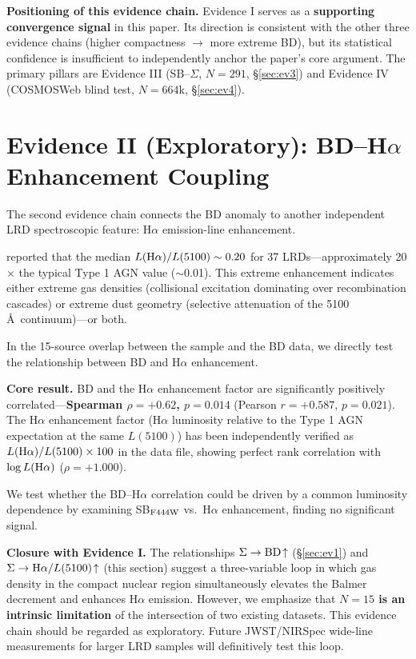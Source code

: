 \documentclass[twocolumn,linenumbers]{aastex631}
\begin{document}
\textbf{Positioning of this evidence chain.} Evidence I serves as a \textbf{supporting convergence signal} in this paper. Its direction is consistent with the other three evidence chains (higher compactness $\rightarrow$ more extreme BD), but its statistical confidence is insufficient to independently anchor the paper's core argument. The primary pillars are Evidence III (SB--$\Sigma$, $N=291$, \S\ref{sec:ev3}) and Evidence IV (COSMOSWeb blind test, $N=664$k, \S\ref{sec:ev4}).

\section{Evidence II (Exploratory): BD--H$\alpha$ Enhancement Coupling} \label{sec:ev2}

The second evidence chain connects the BD anomaly to another independent LRD spectroscopic feature: H$\alpha$ emission-line enhancement.

\citet{Yanagisawa2026} reported that the median $L({\rm H}\alpha)/L(5100) \sim 0.20$ for 37 LRDs---approximately 20$\times$ the typical Type 1 AGN value ($\sim$0.01). This extreme enhancement indicates either extreme gas densities (collisional excitation dominating over recombination cascades) or extreme dust geometry (selective attenuation of the 5100\,\AA\ continuum)---or both.

In the 15-source overlap between the \citet{Yanagisawa2026} sample and the \citet{deGraaff2025} BD data, we directly test the relationship between BD and H$\alpha$ enhancement.

\textbf{Core result.} BD and the H$\alpha$ enhancement factor are significantly positively correlated---\textbf{Spearman $\rho = +0.62$, $p = 0.014$} (Pearson $r = +0.587$, $p = 0.021$). The H$\alpha$ enhancement factor (H$\alpha$ luminosity relative to the Type 1 AGN expectation at the same $L(5100)$) has been independently verified as $L({\rm H}\alpha)/L(5100) \times 100$ in the data file, showing perfect rank correlation with $\log L({\rm H}\alpha)$ ($\rho = +1.000$).

We test whether the BD--H$\alpha$ correlation could be driven by a common luminosity dependence by examining SB$_{\rm F444W}$ vs.\ H$\alpha$ enhancement, finding no significant signal.

\textbf{Closure with Evidence I.} The relationships $\Sigma \rightarrow {\rm BD}\!\uparrow$ (\S\ref{sec:ev1}) and $\Sigma \rightarrow {\rm H}\alpha/L(5100)\!\uparrow$ (this section) suggest a three-variable loop in which gas density in the compact nuclear region simultaneously elevates the Balmer decrement and enhances H$\alpha$ emission. However, we emphasize that \textbf{$N=15$ is an intrinsic limitation} of the intersection of two existing datasets. This evidence chain should be regarded as exploratory. Future JWST/NIRSpec wide-line measurements for larger LRD samples will definitively test this loop.
\end{document}
